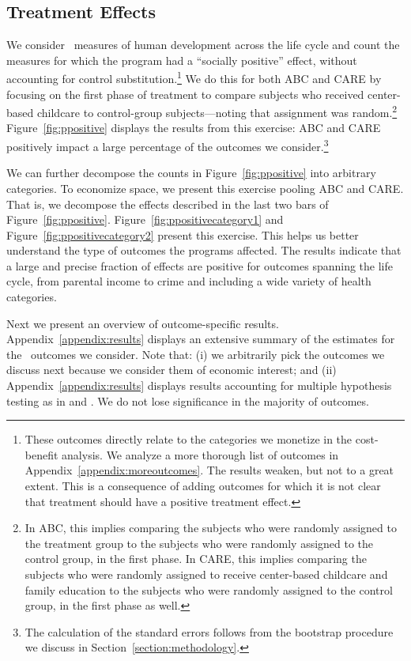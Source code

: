 \subsection{Treatment Effects} \label{section:teresults}

We consider \noutcomes\ measures of human development across the life cycle and count the measures for which the program had a ``socially positive'' effect, without accounting for control substitution.\footnote{These outcomes directly relate to the categories we monetize in the cost-benefit analysis. We analyze a more thorough list of outcomes in Appendix~\ref{appendix:moreoutcomes}. The results weaken, but not to a great extent. This is a consequence of adding outcomes for which it is not clear that treatment should have a positive treatment effect.} We do this for both ABC and CARE by focusing on the first phase of treatment to compare subjects who received center-based childcare to control-group subjects---noting that assignment was random.\footnote{In ABC, this implies comparing the subjects who were randomly assigned to the treatment group to the subjects who were randomly assigned to the control group, in the first phase. In CARE, this implies comparing the subjects who were randomly assigned to receive center-based childcare and family education to the subjects who were randomly assigned to the control group, in the first phase as well.} Figure~\ref{fig:ppositive} displays the results from this exercise: ABC and CARE positively impact a large percentage of the outcomes we consider.\footnote{The calculation of the standard errors follows from the bootstrap procedure we discuss in Section~\ref{section:methodology}.}

We can further decompose the counts in Figure~\ref{fig:ppositive} into arbitrary categories. To economize space, we present this exercise pooling ABC and CARE. That is, we decompose the effects described in the last two bars of Figure~\ref{fig:ppositive}. Figure~\ref{fig:ppositivecategory1} and Figure~\ref{fig:ppositivecategory2} present this exercise. This helps us better understand the type of outcomes the programs affected. The results indicate that a large and precise fraction of effects are positive for outcomes spanning the life cycle, from parental income to crime and including a wide variety of health categories.

Next we present an overview of outcome-specific results. Appendix~\ref{appendix:results} displays an extensive summary of the estimates for the \noutcomes\ outcomes we consider. Note that: (i) we arbitrarily pick the outcomes we discuss next because we consider them of economic interest; and (ii) Appendix~\ref{appendix:results} displays results accounting for multiple hypothesis testing as in \citet{Lehman_Romano_2005_AnnStat} and \citet{Romano_Shaikh_2006_AnnStat}. We do not lose significance in the majority of outcomes.

